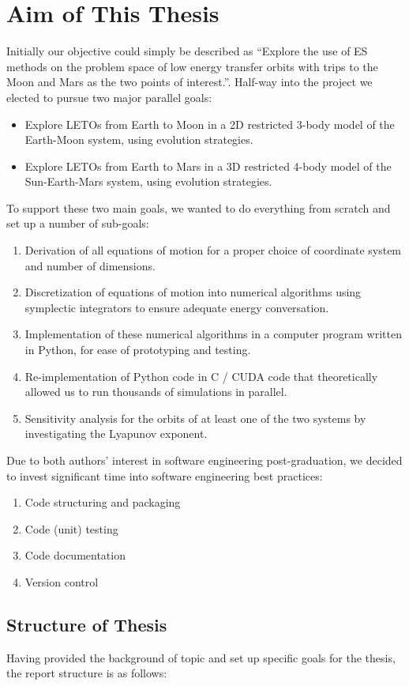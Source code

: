 \section{Aim of This Thesis}
Initially our objective could simply be described as ``Explore the use of ES methods on the problem space of low energy transfer orbits with trips to the Moon and Mars as the two points of interest.''. Half-way into the project we elected to pursue two major parallel goals:
\begin{itemize}
	\item Explore LETOs from Earth to Moon in a 2D restricted 3-body model of the Earth-Moon system, using evolution strategies.
	\item Explore LETOs from Earth to Mars in a 3D restricted 4-body model of the Sun-Earth-Mars system, using evolution strategies.
\end{itemize}
To support these two main goals, we wanted to do everything from scratch and set up a number of sub-goals:
\begin{enumerate}
	\item Derivation of all equations of motion for a proper choice of coordinate system and number of dimensions.
	\item Discretization of equations of motion into numerical algorithms using symplectic integrators to ensure adequate energy conversation.
	\item Implementation of these numerical algorithms in a computer program written in Python, for ease of prototyping and testing.
	\item Re-implementation of Python code in C / CUDA code that theoretically allowed us to run thousands of simulations in parallel.
	\item Sensitivity analysis for the orbits of at least one of the two systems by investigating the Lyapunov exponent.
\end{enumerate}
Due to both authors' interest in software engineering post-graduation, we decided to invest significant time into software engineering best practices:
\begin{enumerate}
	\item Code structuring and packaging
	\item Code (unit) testing 
	\item Code documentation
	\item Version control
\end{enumerate}

\subsection{Structure of Thesis}
Having provided the background of topic and set up specific goals for the thesis, the report structure is as follows:

